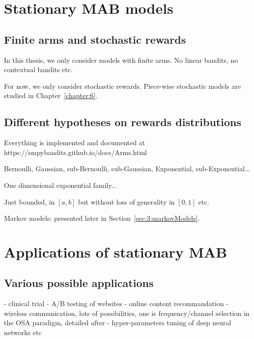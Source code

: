 \section{Stationary MAB models}
\label{sec:2:notations}

\subsection{Finite arms and stochastic rewards}

In this thesis, we only consider models with finite arms.
No linear bandits, no contextual bandits etc.


For now, we only consider stochastic rewards. Piece-wise stochastic models are studied in Chapter~\ref{chapter:6}.


\subsection{Different hypotheses on rewards distributions}

Everything is implemented and documented at
https://smpybandits.github.io/docs/Arms.html

Bernoulli, Gaussian, sub-Bernoulli, sub-Gaussian, Exponential, sub-Exponential...

One dimensional exponential family...

Just bounded, in $[a,b]$ but without loss of generality in $[0,1]$ etc.

Markov models: presented later in Section~\ref{sec:3:markovModels}.


\section{Applications of stationary MAB}
\label{sec:2:applicationsofStationaryMAB}

\subsection{Various possible applications}

- clinical trial
- A/B testing of websites
- online content recommandation
- wireless communication, lots of possibilities, one is frequency/channel selection in the OSA paradigm, detailed after
- hyper-parameters tuning of deep neural networks etc


